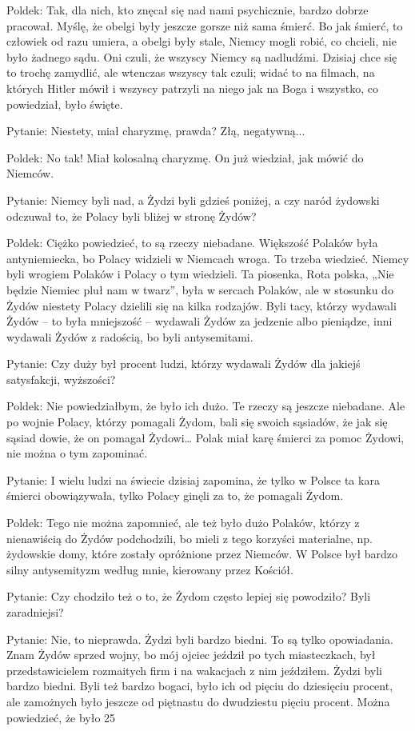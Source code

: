 Poldek: Tak, dla nich, kto znęcał się nad nami psychicznie, bardzo dobrze pracował. Myślę, że obelgi były jeszcze gorsze niż sama śmierć. Bo jak śmierć, to człowiek od razu umiera, a obelgi były stale, Niemcy mogli robić, co chcieli, nie było żadnego sądu. Oni czuli, że wszyscy Niemcy są nadludźmi. Dzisiaj chce się to trochę zamydlić, ale wtenczas wszyscy tak czuli; widać to na filmach, na których Hitler mówił i wszyscy patrzyli na niego jak na Boga i wszystko, co powiedział, było święte.  

Pytanie: Niestety, miał charyzmę, prawda? Złą, negatywną... 

Poldek: No tak! Miał kolosalną charyzmę. On już wiedział, jak mówić do Niemców. 

Pytanie: Niemcy byli nad, a Żydzi byli gdzieś poniżej, a czy naród żydowski odczuwał to, że Polacy byli bliżej w stronę Żydów?  

Poldek: Ciężko powiedzieć, to są rzeczy niebadane. Większość Polaków była antyniemiecka, bo Polacy widzieli w Niemcach wroga. To trzeba wiedzieć. Niemcy byli wrogiem Polaków i Polacy o tym wiedzieli. Ta piosenka, Rota polska, „Nie będzie Niemiec pluł nam w twarz”, była w sercach Polaków, ale w stosunku do Żydów niestety Polacy dzielili się na kilka rodzajów. Byli tacy, którzy wydawali Żydów – to była mniejszość – wydawali Żydów za jedzenie albo pieniądze, inni wydawali Żydów z radością, bo byli antysemitami.  

Pytanie: Czy duży był procent ludzi, którzy wydawali Żydów dla jakiejś satysfakcji, wyższości?   

Poldek: Nie powiedziałbym, że było ich dużo. Te rzeczy są jeszcze niebadane. Ale po wojnie Polacy, którzy pomagali Żydom, bali się swoich sąsiadów, że jak się sąsiad dowie, że on pomagał Żydowi… Polak miał karę śmierci za pomoc Żydowi, nie można o tym zapominać. 

Pytanie: I wielu ludzi na świecie dzisiaj zapomina, że tylko w Polsce ta kara śmierci obowiązywała, tylko Polacy ginęli za to, że pomagali Żydom. 

Poldek: Tego nie można zapomnieć, ale też było dużo Polaków, którzy z nienawiścią do Żydów podchodzili, bo mieli z tego korzyści materialne, np. żydowskie domy, które zostały opróżnione przez Niemców. W Polsce był bardzo silny antysemityzm według mnie, kierowany przez Kościół.   

 Pytanie: Czy chodziło też o to, że Żydom często lepiej się powodziło? Byli zaradniejsi? 

Pytanie: Nie, to nieprawda. Żydzi byli bardzo biedni. To są tylko opowiadania. Znam Żydów sprzed wojny, bo mój ojciec jeździł po tych miasteczkach, był przedstawicielem rozmaitych firm i na wakacjach z nim jeździłem. Żydzi byli bardzo biedni. Byli też bardzo bogaci, było ich od pięciu do dziesięciu procent, ale zamożnych było jeszcze od piętnastu do dwudziestu pięciu procent. Można powiedzieć, że było 25%

